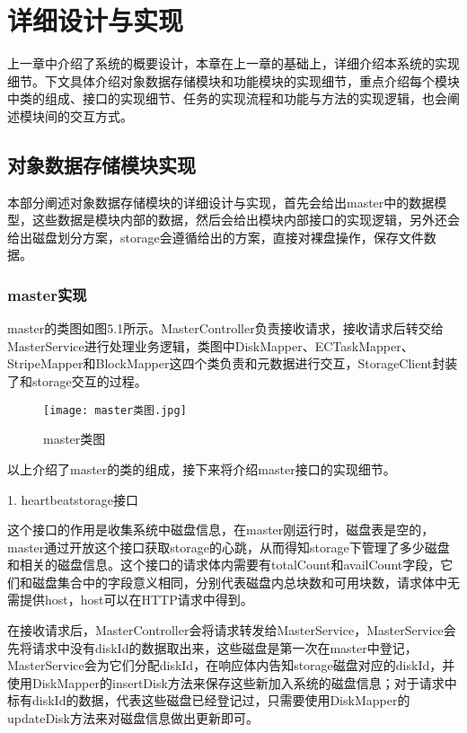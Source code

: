 
\chapter{详细设计与实现}
上一章中介绍了系统的概要设计，本章在上一章的基础上，详细介绍本系统的实现细节。下文具体介绍对象数据存储模块和功能模块的实现细节，重点介绍每个模块中类的组成、接口的实现细节、任务的实现流程和功能与方法的实现逻辑，也会阐述模块间的交互方式。

\section{对象数据存储模块实现}%
本部分阐述对象数据存储模块的详细设计与实现，首先会给出master中的数据模型，这些数据是模块内部的数据，然后会给出模块内部接口的实现逻辑，另外还会给出磁盘划分方案，storage会遵循给出的方案，直接对裸盘操作，保存文件数据。

\subsection{master实现}%
master的类图如图5.1所示。MasterController负责接收请求，接收请求后转交给MasterService进行处理业务逻辑，类图中DiskMapper、ECTaskMapper、StripeMapper和BlockMapper这四个类负责和元数据进行交互，StorageClient封装了和storage交互的过程。

\begin{figure}
  \centering
  \texttt{[image: master类图.jpg]}
  \caption{master类图}
\end{figure}

以上介绍了master的类的组成，接下来将介绍master接口的实现细节。

1. heartbeatstorage接口

这个接口的作用是收集系统中磁盘信息，在master刚运行时，磁盘表是空的，master通过开放这个接口获取storage的心跳，从而得知storage下管理了多少磁盘和相关的磁盘信息。这个接口的请求体内需要有totalCount和availCount字段，它们和磁盘集合中的字段意义相同，分别代表磁盘内总块数和可用块数，请求体中无需提供host，host可以在HTTP请求中得到。

在接收请求后，MasterController会将请求转发给MasterService，MasterService会先将请求中没有diskId的数据取出来，这些磁盘是第一次在master中登记，MasterService会为它们分配diskId，在响应体内告知storage磁盘对应的diskId，并使用DiskMapper的insertDisk方法来保存这些新加入系统的磁盘信息；对于请求中标有diskId的数据，代表这些磁盘已经登记过，只需要使用DiskMapper的updateDisk方法来对磁盘信息做出更新即可。

